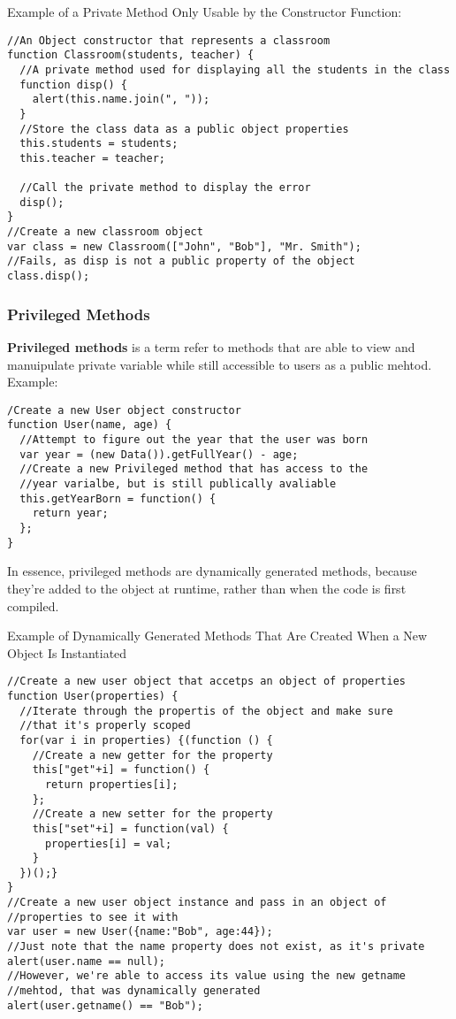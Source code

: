 \documentclass[a4paper,11pt]{book}
\begin{document}
Example of a Private Method Only Usable by the Constructor Function:
\begin{verbatim}
//An Object constructor that represents a classroom
function Classroom(students, teacher) {
  //A private method used for displaying all the students in the class
  function disp() {
    alert(this.name.join(", "));
  }
  //Store the class data as a public object properties
  this.students = students;
  this.teacher = teacher;

  //Call the private method to display the error
  disp();
}
//Create a new classroom object
var class = new Classroom(["John", "Bob"], "Mr. Smith");
//Fails, as disp is not a public property of the object
class.disp();
\end{verbatim}
\subsubsection{Privileged Methods}
\textbf{Privileged methods} is a term refer to methods that are able to view and
manuipulate private variable while still accessible to users as a public mehtod.
Example:
\begin{verbatim}
/Create a new User object constructor
function User(name, age) {
  //Attempt to figure out the year that the user was born
  var year = (new Data()).getFullYear() - age;
  //Create a new Privileged method that has access to the
  //year varialbe, but is still publically avaliable
  this.getYearBorn = function() {
    return year;
  };
}
\end{verbatim}
In essence, privileged methods are dynamically generated methods, because
they're added to the object at runtime, rather than when the code is first
compiled.

Example of Dynamically Generated Methods That Are Created When a New Object Is
Instantiated
\begin{verbatim}
//Create a new user object that accetps an object of properties
function User(properties) {
  //Iterate through the propertis of the object and make sure
  //that it's properly scoped
  for(var i in properties) {(function () {
    //Create a new getter for the property
    this["get"+i] = function() {
      return properties[i];
    };
    //Create a new setter for the property
    this["set"+i] = function(val) {
      properties[i] = val;
    }
  })();}
}
//Create a new user object instance and pass in an object of
//properties to see it with
var user = new User({name:"Bob", age:44});
//Just note that the name property does not exist, as it's private
alert(user.name == null);
//However, we're able to access its value using the new getname
//mehtod, that was dynamically generated
alert(user.getname() == "Bob");
\end{verbatim}
\end{document}
